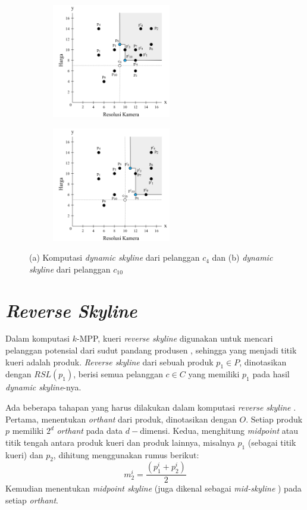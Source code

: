 \begin{figure}[h]
	\centering
	\begin{subfigure}{.5\textwidth}
		\centering
		\includegraphics[height=5cm]{assets/img/bab2/dsl-1.png}
		\caption{}
	\end{subfigure}%
	\begin{subfigure}{.5\textwidth}
		\centering
		\includegraphics[height=5cm]{assets/img/bab2/dsl-2.png}
		\caption{}
	\end{subfigure}
	\caption{(a) Komputasi \textit{dynamic skyline} dari pelanggan $c_{4}$ dan (b) \textit{dynamic skyline} dari pelanggan $c_{10}$}
	\label{fig:dsl}
\end{figure}

\section{\textit{Reverse Skyline}}
\tab Dalam komputasi $k$-MPP, kueri \textit{reverse skyline} digunakan untuk mencari pelanggan potensial dari sudut pandang produsen \cite{kmpp}, sehingga yang menjadi titik kueri adalah produk. \textit{Reverse skyline} \cite{reverse-skyline} dari sebuah produk $p_1 \in
P$, dinotasikan dengan $RSL(p_1)$, berisi semua pelanggan $c \in C$ yang memiliki $p_1$ pada hasil \textit{dynamic skyline}-nya.

Ada beberapa tahapan yang harus dilakukan dalam komputasi \textit{reverse skyline} \cite{kmpp}. Pertama, menentukan \textit{orthant} dari produk, dinotasikan dengan $O$. Setiap produk $p$ memiliki $2^d$ \textit{orthant} pada data $d-$dimensi. Kedua, menghitung \textit{midpoint} atau titik tengah antara produk kueri dan produk lainnya, misalnya $p_1$ (sebagai titik kueri) dan $p_2$, dihitung menggunakan rumus berikut: 
\begin{equation} \label{eq:midpoint}
m_2^i = \frac{(p_1^i + p_2^i)}{2}
\end{equation}
Kemudian menentukan \textit{midpoint skyline} (juga dikenal sebagai \textit{mid-skyline} \cite{mid-skyline}) pada setiap \textit{orthant}.

